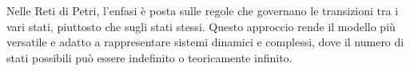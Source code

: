 Nelle Reti di Petri, l'enfasi è posta sulle regole che governano le transizioni tra i vari stati, piuttosto che sugli stati stessi. Questo approccio rende il modello più versatile e adatto a rappresentare sistemi dinamici e complessi, dove il numero di stati possibili può essere indefinito o teoricamente infinito.
